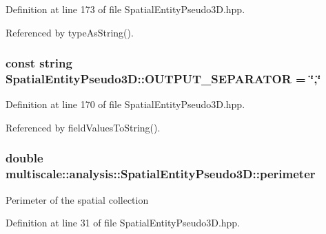 \-Definition at line 173 of file \-Spatial\-Entity\-Pseudo3\-D.\-hpp.



\-Referenced by type\-As\-String().

\hypertarget{classmultiscale_1_1analysis_1_1SpatialEntityPseudo3D_a4ee08be9b4119b90f0a996704d179635}{
\subsubsection[{\-O\-U\-T\-P\-U\-T\-\_\-\-S\-E\-P\-A\-R\-A\-T\-O\-R}]{\setlength{\rightskip}{0pt plus 5cm}const string {\bf \-Spatial\-Entity\-Pseudo3\-D\-::\-O\-U\-T\-P\-U\-T\-\_\-\-S\-E\-P\-A\-R\-A\-T\-O\-R} = \char`\"{},\char`\"{}}}\label{classmultiscale_1_1analysis_1_1SpatialEntityPseudo3D_a4ee08be9b4119b90f0a996704d179635}


\-Definition at line 170 of file \-Spatial\-Entity\-Pseudo3\-D.\-hpp.



\-Referenced by field\-Values\-To\-String().

\hypertarget{classmultiscale_1_1analysis_1_1SpatialEntityPseudo3D_aee84039be272f902a2d871f61da47360}{
\subsubsection[{perimeter}]{\setlength{\rightskip}{0pt plus 5cm}double {\bf multiscale\-::analysis\-::\-Spatial\-Entity\-Pseudo3\-D\-::perimeter}}}\label{classmultiscale_1_1analysis_1_1SpatialEntityPseudo3D_aee84039be272f902a2d871f61da47360}
\-Perimeter of the spatial collection 

\-Definition at line 31 of file \-Spatial\-Entity\-Pseudo3\-D.\-hpp.



